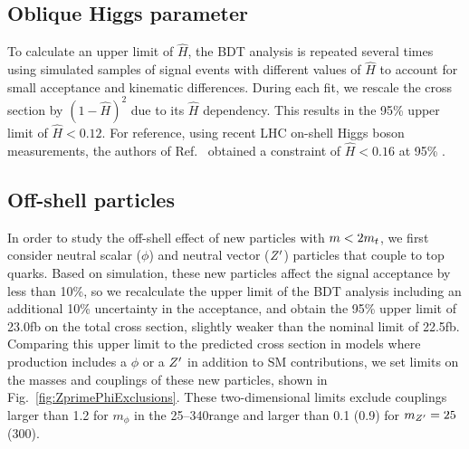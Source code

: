 \FloatBarrier

\subsection{Oblique Higgs parameter}

To calculate an upper limit of $\hat{H}$, the BDT analysis is repeated
several times using simulated samples of \tttt signal events with different
values of $\hat{H}$ to account for small acceptance and kinematic
differences. During each fit, we rescale the \ttH cross section by
$(1-\hat{H})^2$ due to its $\hat{H}$ dependency. This results in the 95\% \CL
upper limit of $\hat{H} < 0.12$. For reference, using recent LHC on-shell
Higgs boson measurements, the authors of Ref.~\cite{THEORY:ObliqueHiggs2019}
obtained a constraint of $\hat{H} < 0.16$ at 95\% \CL.


\subsection{Off-shell particles}

In order to study the off-shell effect of new particles with $m < 2m_t$,
we first consider neutral scalar ($\phi$) and neutral vector ($Z^\prime$)
particles that couple to top quarks. Based on simulation, these new particles
affect the signal acceptance by less than 10\%, so we recalculate the
\xsectttt upper limit of the BDT analysis including an additional 10\%
uncertainty in the acceptance, and obtain the 95\% \CL upper limit of
23.0\unit{fb} on the total \tttt cross section, slightly weaker than the
nominal limit of 22.5\unit{fb}. Comparing this upper limit to the predicted
cross section in models where \tttt production includes a $\phi$ or a
$Z^\prime$ in addition to SM contributions, we set limits on the masses and
couplings of these new particles, shown in
Fig.~\ref{fig:ZprimePhiExclusions}. These two-dimensional limits 
exclude couplings larger
than 1.2 for $m_{\phi}$ in the 25--340\GeV range and larger than 0.1 (0.9)
for $m_{Z^\prime} = 25$ (300)\GeV.

